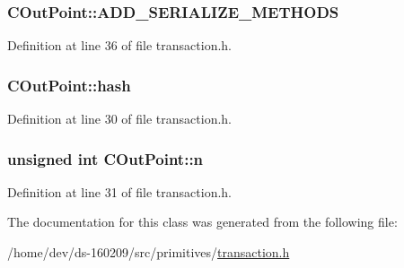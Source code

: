 \subsubsection[{A\+D\+D\+\_\+\+S\+E\+R\+I\+A\+L\+I\+Z\+E\+\_\+\+M\+E\+T\+H\+O\+D\+S}]{\setlength{\rightskip}{0pt plus 5cm}C\+Out\+Point\+::\+A\+D\+D\+\_\+\+S\+E\+R\+I\+A\+L\+I\+Z\+E\+\_\+\+M\+E\+T\+H\+O\+D\+S}\label{class_c_out_point_ac025da4b121ed1bca9a4d88bcb9d3a90}


Definition at line 36 of file transaction.\+h.

\hypertarget{class_c_out_point_af131c7194a660558b0ff158f4efa7a28}{}
\subsubsection[{hash}]{ C\+Out\+Point\+::hash}\label{class_c_out_point_af131c7194a660558b0ff158f4efa7a28}


Definition at line 30 of file transaction.\+h.

\hypertarget{class_c_out_point_a9fbc648ca0d11421ad66e897185a9b58}{}
\subsubsection[{n}]{\setlength{\rightskip}{0pt plus 5cm}unsigned int C\+Out\+Point\+::n}\label{class_c_out_point_a9fbc648ca0d11421ad66e897185a9b58}


Definition at line 31 of file transaction.\+h.



The documentation for this class was generated from the following file\+:\begin{DoxyCompactItemize}
\item 
/home/dev/ds-\/160209/src/primitives/\hyperlink{transaction_8h}{transaction.\+h}\end{DoxyCompactItemize}
